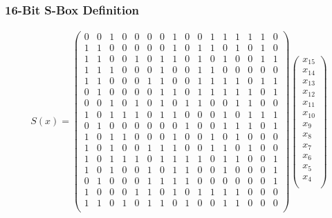 \documentclass[handout,10pt]{beamer}
\begin{document}
\begin{frame}
	\frametitle{16-Bit S-Box Definition}
\small
\begin{align*}
S(x) =  
\begin{pmatrix}
0 & 0 & 1 & 0 & 0 & 0 & 0 & 1 & 0 & 0 & 1 & 1 & 1 & 1 & 1 & 0 \\
1 & 1 & 0 & 0 & 0 & 0 & 0 & 1 & 0 & 1 & 1 & 0 & 1 & 0 & 1 & 0 \\
1 & 1 & 0 & 0 & 1 & 0 & 1 & 1 & 0 & 1 & 0 & 1 & 0 & 0 & 1 & 1 \\
1 & 1 & 1 & 0 & 0 & 0 & 1 & 0 & 0 & 1 & 1 & 0 & 0 & 0 & 0 & 0 \\
1 & 1 & 0 & 0 & 0 & 1 & 1 & 0 & 0 & 1 & 1 & 1 & 1 & 0 & 1 & 1 \\
0 & 1 & 0 & 0 & 0 & 0 & 1 & 1 & 0 & 1 & 1 & 1 & 1 & 1 & 0 & 1 \\
0 & 0 & 1 & 0 & 1 & 0 & 1 & 0 & 1 & 1 & 0 & 0 & 1 & 1 & 0 & 0 \\
1 & 0 & 1 & 1 & 1 & 0 & 1 & 1 & 0 & 0 & 0 & 1 & 0 & 1 & 1 & 1 \\
0 & 1 & 0 & 0 & 0 & 0 & 0 & 0 & 1 & 0 & 0 & 1 & 1 & 1 & 0 & 1 \\
1 & 0 & 1 & 1 & 0 & 0 & 0 & 1 & 0 & 0 & 1 & 0 & 1 & 0 & 0 & 0 \\
1 & 0 & 1 & 0 & 0 & 1 & 1 & 1 & 0 & 0 & 1 & 1 & 0 & 1 & 0 & 0 \\
1 & 0 & 1 & 1 & 1 & 0 & 1 & 1 & 1 & 1 & 0 & 1 & 1 & 0 & 0 & 1 \\
1 & 0 & 1 & 0 & 0 & 1 & 0 & 1 & 1 & 0 & 0 & 1 & 0 & 0 & 0 & 1 \\
0 & 1 & 0 & 0 & 0 & 1 & 1 & 1 & 1 & 0 & 0 & 0 & 0 & 0 & 0 & 1 \\
1 & 0 & 0 & 0 & 1 & 1 & 0 & 1 & 0 & 1 & 1 & 1 & 1 & 0 & 0 & 0 \\
1 & 1 & 0 & 1 & 0 & 1 & 1 & 0 & 1 & 0 & 0 & 1 & 1 & 0 & 0 & 0 \\
\end{pmatrix}
\begin{pmatrix}
x_{15} \\
x_{14} \\
x_{13} \\
x_{12} \\
x_{11} \\
x_{10} \\
x_{9} \\
x_{8} \\
x_{7} \\
x_{6} \\
x_{5} \\
x_{4} \\

\end{pmatrix}
\end{align*}
\end{frame}
\end{document}
